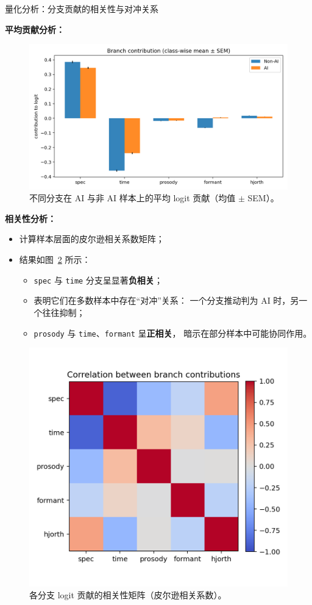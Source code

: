 \documentclass[aspectratio=169]{beamer}
\begin{document}
\begin{frame}{量化分析：分支贡献的相关性与对冲关系}

\textbf{平均贡献分析：}
\begin{figure}
  \centering
  \includegraphics[width=0.75\linewidth]{images_in_paper/contrib_means_by_class.png}
  \caption{不同分支在 AI 与非 AI 样本上的平均 logit 贡献（均值 $\pm$ SEM）。}
  \label{fig:contrib_means_by_class}
\end{figure}

\textbf{相关性分析：}
\begin{itemize}
  \item 计算样本层面的皮尔逊相关系数矩阵；
  \item 结果如图~\ref{fig:contrib_corr} 所示：
    \begin{itemize}
      \item \texttt{spec} 与 \texttt{time} 分支呈显著\textbf{负相关}；
      \item 表明它们在多数样本中存在“对冲”关系：
        一个分支推动判为 AI 时，另一个往往抑制；
      \item \texttt{prosody} 与 \texttt{time}、\texttt{formant} 呈\textbf{正相关}，
        暗示在部分样本中可能协同作用。
    \end{itemize}
\end{itemize}

\vspace{0.5em}
\begin{figure}
  \centering
  \includegraphics[width=0.5\linewidth]{images_in_paper/contrib_correlation.png}
  \caption{各分支 logit 贡献的相关性矩阵（皮尔逊相关系数）。}
  \label{fig:contrib_corr}
\end{figure}

\end{frame}
\end{document}
